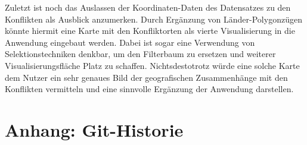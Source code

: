 \documentclass[usegeometry=true]{scrartcl}
\begin{document}
Zuletzt ist noch das Auslassen der Koordinaten-Daten des Datensatzes zu den Konflikten als Ausblick anzumerken. Durch Ergänzung von Länder-Polygonzügen könnte hiermit eine Karte mit den Konfliktorten als vierte Visualisierung in die Anwendung eingebaut werden. Dabei ist sogar eine Verwendung von Selektionstechniken denkbar, um den Filterbaum zu ersetzen und weiterer Visualisierungsfläche Platz zu schaffen. Nichtsdestotrotz würde eine solche Karte dem Nutzer ein sehr genaues Bild der geografischen Zusammenhänge mit den Konflikten vermitteln und eine sinnvolle Ergänzung der Anwendung darstellen.\\

\section*{Anhang: Git-Historie}
\end{document}
